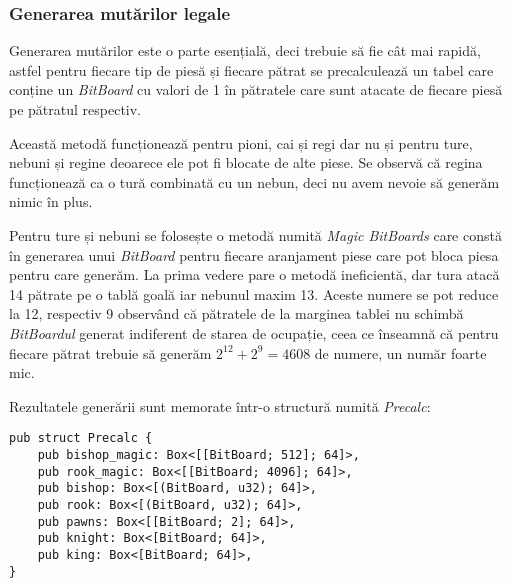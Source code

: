 \vspace{1cm}
\subsubsection{Generarea mutărilor legale}
\vspace{1cm}

Generarea mutărilor este o parte esențială, deci trebuie să fie cât mai rapidă,
astfel pentru fiecare tip de piesă și fiecare pătrat se precalculează un tabel
care conține un \textit{BitBoard} cu valori de 1 în pătratele care sunt atacate
de fiecare piesă pe pătratul respectiv.
\vspace{0.2cm}

Această metodă funcționează pentru pioni, cai și regi dar nu și pentru ture, nebuni și
regine deoarece ele pot fi blocate de alte piese. Se observă că regina funcționează ca
o tură combinată cu un nebun, deci nu avem nevoie să generăm nimic în plus.
\vspace{0.2cm}

Pentru ture și nebuni se folosește o metodă numită \textit{Magic BitBoards} care constă în generarea
unui \textit{BitBoard} pentru fiecare aranjament piese care pot bloca piesa pentru care
generăm. La prima vedere pare o metodă ineficientă, dar tura atacă 14 pătrate pe o tablă goală
iar nebunul maxim 13. Aceste numere se pot reduce la 12, respectiv 9 observând că pătratele
de la marginea tablei nu schimbă \textit{BitBoardul} generat indiferent de starea de ocupație,
ceea ce înseamnă că pentru fiecare pătrat trebuie să generăm ${2^{12} + 2^9 = 4608}$ de numere,
un număr foarte mic.

Rezultatele generării sunt memorate într-o structură numită \textit{Precalc}:
\begin{lstlisting}[language=RustHtml]
pub struct Precalc {
    pub bishop_magic: Box<[[BitBoard; 512]; 64]>,
    pub rook_magic: Box<[[BitBoard; 4096]; 64]>,
    pub bishop: Box<[(BitBoard, u32); 64]>,
    pub rook: Box<[(BitBoard, u32); 64]>,
    pub pawns: Box<[[BitBoard; 2]; 64]>,
    pub knight: Box<[BitBoard; 64]>,
    pub king: Box<[BitBoard; 64]>,
}
\end{lstlisting}
